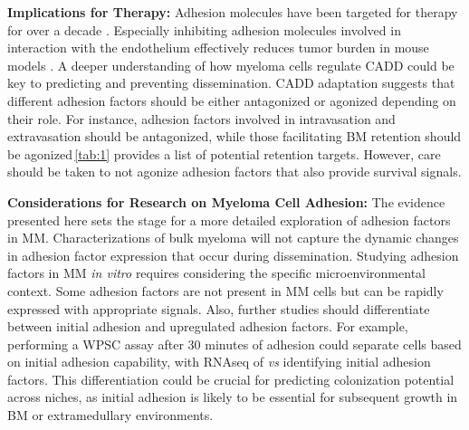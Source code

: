 \textbf{Implications for Therapy:}
Adhesion molecules have been targeted for therapy for over a decade
\cite{nairChapterSixEmerging2012, neriTargetingAdhesionMolecules2012}.
Especially inhibiting adhesion molecules involved in interaction with the
endothelium effectively reduces tumor burden in mouse models
\cite{asosinghUniquePathwayHoming2001a,
      mrozikTherapeuticTargetingNcadherin2015}. A deeper understanding of how myeloma
cells regulate \ac{CADD} could be key to predicting and preventing
dissemination. \ac{CADD} adaptation suggests that different adhesion factors
should be either antagonized or agonized depending on their role. For instance,
adhesion factors involved in intravasation and extravasation should be
antagonized, while those facilitating BM retention should be
agonized\,\textemdash\autoref{tab:1} provides a list of potential retention
targets. However, care should be taken to not agonize adhesion factors that also
provide survival signals.



\textbf{Considerations for Research on Myeloma Cell Adhesion:}
The evidence presented here sets the stage for a more detailed exploration of
adhesion factors in MM. Characterizations of bulk myeloma will not capture
the dynamic changes in adhesion factor expression that occur during dissemination.
Studying adhesion factors in MM \textit{in vitro} requires considering the
specific microenvironmental context. Some adhesion factors are not present in MM
cells but can be rapidly expressed with appropriate signals. Also, further
studies should differentiate between initial adhesion and upregulated adhesion
factors. For example, performing a \ac{WPSC} assay after 30 minutes of adhesion
could separate  cells based on initial adhesion capability, with RNAseq of
\nMAina \textit{vs} \MAina identifying initial adhesion factors. This
differentiation could be crucial for predicting colonization potential across
niches, as initial adhesion is likely to be essential for subsequent growth in
\ac{BM} or extramedullary environments.




